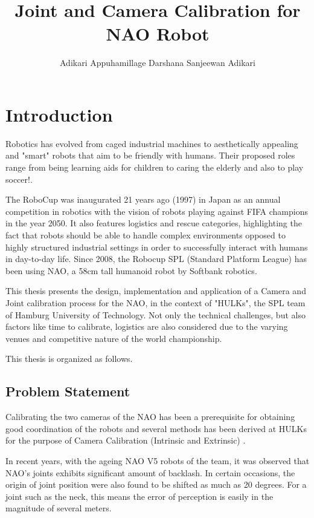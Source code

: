 \documentclass[english, printversion, nomenclature, notitle]{tuvisionthesis} %
\author{Adikari Appuhamillage Darshana Sanjeewan Adikari}
\title{Joint and Camera Calibration for NAO Robot}
\begin{document}
\hypersetup{
	pdfauthor=\@author\relax,
	pdftitle=\@title\relax
}
\tuvisionheading
\hypersetup{pageanchor=true}
\clearpage{\thispagestyle{empty}\cleardoublepage}

\chapter{Introduction}

Robotics has evolved from caged industrial machines to aesthetically appealing and "smart" robots that aim to be friendly with humans. Their proposed roles range from being learning aids for children to caring the elderly and also to play soccer!.

The RoboCup was inaugurated 21 years ago (1997) in Japan as an annual competition in robotics with the vision of robots playing against FIFA champions in the year 2050. It also features  logistics and rescue categories, highlighting  the fact that robots should be able to handle complex environments opposed to highly structured industrial settings in order to successfully interact with humans in day-to-day life.  Since 2008, the Robocup SPL (Standard Platform League) has been using NAO, a 58cm tall humanoid robot by Softbank robotics.

This thesis presents the design, implementation and application of a Camera and Joint calibration process for the NAO, in the context of "HULKs", the SPL team of Hamburg University of Technology. Not only the technical challenges, but also factors like time to calibrate, logistics are also considered due to the varying venues and competitive nature of the world championship.

This thesis is organized as follows. 

\section{Problem Statement}

Calibrating the two cameras of the NAO has been a prerequisite for obtaining good coordination of the robots and several methods has been derived at HULKs for the purpose of Camera Calibration (Intrinsic and Extrinsic) \cite{HULKs2017Report}.

In recent years, with the ageing NAO V5 robots of the team, it was observed that NAO's joints exhibits significant amount of backlash. In certain occasions, the origin of joint position were also found to be shifted as much as 20 degrees. For a joint such as the neck, this means the error of perception is easily in the magnitude of several meters.
\end{document}
